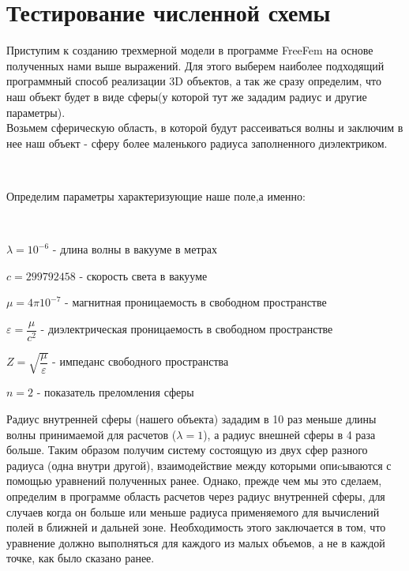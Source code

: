 \section{Тестирование численной схемы}
\begin{flushleft}
	Приступим к созданию трехмерной модели в программе FreeFem на основе полученных нами выше выражений.  Для этого выберем наиболее подходящий программный способ реализации 3D объектов, а так же сразу определим, что наш объект будет в виде сферы(у которой тут же зададим радиус и другие параметры). 
	\\
	Возьмем сферическую область, в которой будут рассеиваться волны и заключим в нее наш объект - сферу более маленького радиуса заполненного диэлектриком.
\end{flushleft} \\
\begin{flushleft}
	Определим параметры характеризующие наше поле,а именно:
\end{flushleft} \\
\begin{flushleft}
	$ \lambda = 10^{-6} $ - длина волны в вакууме в метрах \\
\end{flushleft}
\begin{flushleft}
	$ c = 299792458 $ - скорость света в вакууме \\
\end{flushleft}
\begin{flushleft}
	$ \mu = 4\pi 10^{-7} $ - магнитная проницаемость в свободном пространстве \\
\end{flushleft}
\begin{flushleft}
	$ \varepsilon = \dfrac{\mu}{c^{2}} $ - диэлектрическая проницаемость в свободном пространстве \\
\end{flushleft}
\begin{flushleft}
	$ Z = \sqrt{\dfrac{\mu}{\varepsilon}} $ - импеданс свободного пространства \\
\end{flushleft}
\begin{flushleft}
	$ n = 2 $ - показатель преломления сферы \\
\end{flushleft}
\begin{flushleft}
	Радиус внутренней сферы (нашего объекта) зададим в 10 раз меньше длины волны принимаемой для расчетов ($ \lambda = 1 $), а радиус внешней сферы в 4 раза больше. Таким образом получим систему состоящую из двух сфер разного радиуса (одна внутри другой), взаимодействие между которыми опиcываются с помощью уравнений полученных ранее. Однако, прежде чем мы это сделаем, определим в программе область расчетов через радиус внутренней сферы, для случаев когда он больше или меньше радиуса применяемого для вычислений полей в ближней и дальней зоне. Необходимость этого заключается в том, что уравнение должно выполняться для каждого из малых объемов, а не в каждой точке, как было сказано ранее.
\end{flushleft}
